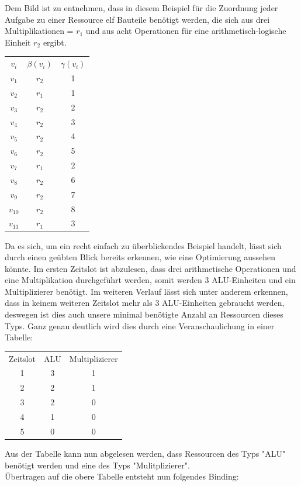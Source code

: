 \documentclass[conference]{IEEEtran}
\begin{document}
Dem Bild ist zu entnehmen, dass in diesem Beispiel für die Zuordnung jeder Aufgabe zu einer Ressource elf Bauteile benötigt werden, die sich aus drei Multiplikationen = $r_1$ und aus acht Operationen für eine arithmetisch-logische Einheit $r_2$ ergibt.\\
 \begin{center}
\begin{tabular}[h]{ccc}
$v_i$&$\beta(v_i)$&$\gamma(v_i)$\\
$v_1$&$r_2$&1\\
$v_2$&$r_1$&1\\
$v_3$&$r_2$&2\\
$v_4$&$r_2$&3\\
$v_5$&$r_2$&4\\
$v_6$&$r_2$&5\\
$v_7$&$r_1$&2\\
$v_8$&$r_2$&6\\
$v_9$&$r_2$&7\\
$v_10$&$r_2$&8\\
$v_11$&$r_1$&3\\
\end{tabular}
\end{center}
Da es sich, um ein recht einfach zu überblickendes Beispiel handelt, lässt sich durch einen geübten Blick bereits erkennen, wie eine Optimierung aussehen könnte. Im ersten Zeitslot ist abzulesen, dass drei arithmetische Operationen und eine Multiplikation durchgeführt werden, somit werden 3 ALU-Einheiten und ein Multiplizierer benötigt. Im weiteren Verlauf lässt sich unter anderem erkennen, dass in keinem weiteren Zeitslot mehr als 3 ALU-Einheiten gebraucht werden, deswegen ist dies auch unsere minimal benötigte Anzahl an Ressourcen dieses Typs. Ganz genau deutlich wird dies durch eine Veranschaulichung in einer Tabelle:\\
\begin{center}
\begin{tabular}[h]{ccc}
Zeitslot&ALU&Multiplizierer\\
1&3&1\\
2&2&1\\
3&2&0\\
4&1&0\\
5&0&0\\
\end{tabular}
\end{center}
Aus der Tabelle kann nun abgelesen werden, dass Ressourcen des Typs "ALU" benötigt werden und eine des Typs "Mulitplizierer".\\
Übertragen auf die obere Tabelle entsteht nun folgendes Binding:\\
\end{document}
